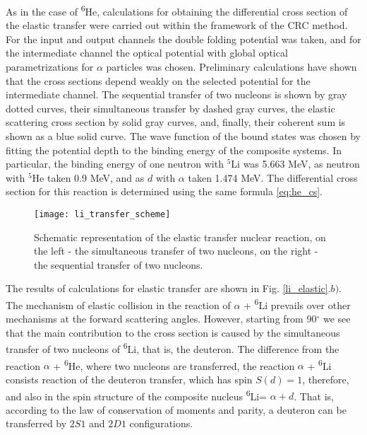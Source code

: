 \documentclass[
12pt, %
oneside, %
english, %
onehalfspacing, %
onehalfspacing, %
headsepline, %
]{MastersDoctoralThesis} %
\newcommand{\he}{\textsuperscript{6}He\xspace}
\newcommand{\li}{\textsuperscript{6}Li\xspace}
\begin{document}
As in the case of \he, calculations for obtaining the differential cross section of the elastic transfer were carried out within the framework of the CRC method. For the input and output channels the double folding potential was taken, and for the intermediate channel the optical potential with global optical parametrizations for $\alpha$ particles \cite{avrigeanu1994global}  was chosen. Preliminary calculations have shown that the cross sections depend weakly on the selected potential for the intermediate channel.
The sequential transfer of two nucleons is shown by gray dotted curves, their simultaneous transfer by dashed gray curves, the elastic scattering cross section by solid gray curves, and, finally, their coherent sum is shown as a blue solid curve. 
The wave function of the bound states was chosen by fitting the potential depth to the binding energy of the composite systems. 
In particular, the binding energy of one neutron with $^5$Li was 5.663 MeV, as neutron with $^5$He taken 0.9 MeV, and as $d$ with  $\alpha$  taken 1.474 MeV. 
The differential cross section for this reaction is determined using the same formula \ref{eq:he_cs}.

\begin{figure}[tp!]
\centering
\texttt{[image: li\_transfer\_scheme]}
\decoRule
\caption{  \footnotesize  Schematic representation of the elastic transfer nuclear reaction, on the left - the simultaneous transfer of two nucleons, on the right - the sequential transfer of two nucleons.
}
\label{li_transfer_scheme}
\end{figure}

The results of calculations for elastic transfer are shown in Fig. \ref{li_elastic}.$b)$. 
The mechanism of elastic collision in the reaction of $\alpha$ + \li   prevails over other mechanisms at the forward scattering angles. 
However, starting from 90$^\circ$ we see that the main contribution to the cross section is caused by the simultaneous transfer of two nucleons of  \li, that is, the deuteron. 
The difference from the reaction $ \alpha $ + \he, where two nucleons are transferred, the reaction $\alpha $ + \li consists reaction of the deuteron transfer, which has spin $S(d)=1$, therefore, and also in the spin structure of the composite nucleus \li = $ \alpha + d $. That is, according to the law of conservation of moments and parity, a deuteron can be transferred by $2S1$ and $2D1$ configurations.
\end{document}
